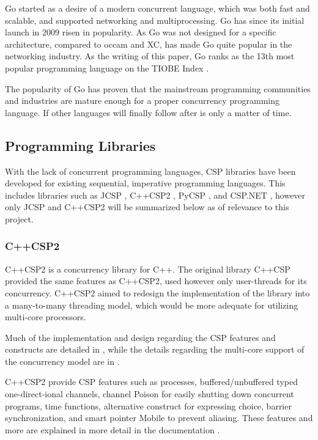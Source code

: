 Go started as a desire of a modern concurrent language, which was both fast and scalable, and supported networking and multiprocessing. Go has since its initial launch in 2009 risen in popularity. As Go was not designed for a specific architecture, compared to occam and XC, has made Go quite popular in the networking industry. As the writing of this paper, Go ranks as the 13th most popular programming language on the TIOBE Index \citep{gopopularity}.

The popularity of Go has proven that the mainstream programming communities and industries are mature enough for a proper concurrency programming language. If other languages will finally follow after is only a matter of time.


\subsection{Programming Libraries}
\label{subsec:csp_prog_lib}

With the lack of concurrent programming languages, CSP libraries have been developed for existing sequential, imperative programming languages. This includes libraries such as JCSP \citep{jcsp}, C++CSP2 \citep{c++csp2}, PyCSP \citep{pycsp}, and CSP.NET \citep{cspnet}, however only JCSP and C++CSP2 will be summarized below as of relevance to this project.


\subsubsection{C++CSP2}
\label{sssec:c++csp2}

C++CSP2 \citep{c++csp2} is a concurrency library for C++. The original library C++CSP \citep{c++csp} provided the same features as C++CSP2, used however only user-threads for its concurrency. C++CSP2 aimed to redesign the implementation of the library into a many-to-many threading model, which would be more adequate for utilizing multi-core processors. 

Much of the implementation and design regarding the CSP features and constructs are detailed in \citet{c++csp}, while the details regarding the multi-core support of the concurrency model are in \citet{c++csp2}.

C++CSP2 provide CSP features such as processes, buffered/unbuffered typed one-direct\hyp{}ional channels, channel Poison for easily shutting down concurrent programs, time functions, alternative construct for expressing choice, barrier synchronization, and smart pointer Mobile to prevent aliasing. These features and more are explained in more detail in the documentation \citep{c++csp2doc}.


